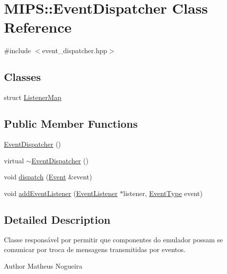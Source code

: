 \hypertarget{classMIPS_1_1EventDispatcher}{}\section{M\+I\+PS\+:\+:Event\+Dispatcher Class Reference}
\label{classMIPS_1_1EventDispatcher}


{\ttfamily \#include $<$event\+\_\+dispatcher.\+hpp$>$}

\subsection*{Classes}
\begin{DoxyCompactItemize}
\item 
struct \hyperlink{structMIPS_1_1EventDispatcher_1_1ListenerMap}{Listener\+Map}
\end{DoxyCompactItemize}
\subsection*{Public Member Functions}
\begin{DoxyCompactItemize}
\item 
\hyperlink{classMIPS_1_1EventDispatcher_ac0274686b219131fffa051f3877cf952}{Event\+Dispatcher} ()
\item 
virtual \hyperlink{classMIPS_1_1EventDispatcher_ac443528f78d0d446590e1d550a9ed41a}{$\sim$\+Event\+Dispatcher} ()
\item 
void \hyperlink{classMIPS_1_1EventDispatcher_a39eedeb6d95d5725a2608880b24ac5fc}{dispatch} (\hyperlink{classMIPS_1_1Event}{Event} \&event)
\item 
void \hyperlink{classMIPS_1_1EventDispatcher_a9e4615cf1c83a18a259b6f48756db486}{add\+Event\+Listener} (\hyperlink{classMIPS_1_1EventListener}{Event\+Listener} $\ast$listener, \hyperlink{event_8hpp_a2b933d1ba3dc5a595db4dfa5b049c78c}{Event\+Type} event)
\end{DoxyCompactItemize}


\subsection{Detailed Description}
Classe responsável por permitir que componentes do emulador possam se comunicar por troca de mensagens transmitidas por eventos.

\begin{DoxyAuthor}{Author}
Matheus Nogueira 
\end{DoxyAuthor}


